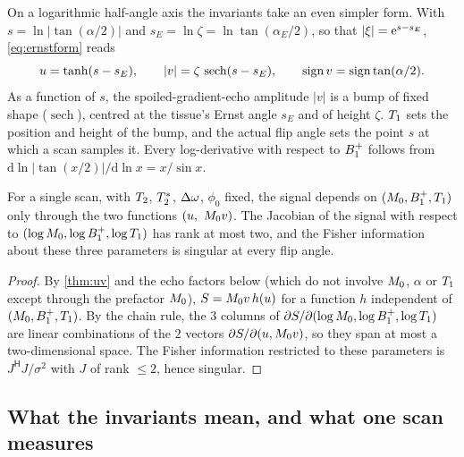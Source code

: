 On a logarithmic half-angle axis the invariants take an even simpler form. With
$s=\ln|\tan(\alpha/2)|$ and $s_E=\ln\zeta=\ln\tan(\alpha_E/2)$, so that $|\xi|=\mathrm{e}^{s-s_E}$, \eqref{eq:ernstform} reads
\begin{equation}
  u=\tanh(s-s_E),\qquad |v|=\zeta\,\operatorname{sech}(s-s_E),\qquad \operatorname{sign} v=\operatorname{sign}\tan(\alpha/2).
  \label{eq:logtan}
\end{equation}
As a function of $s$, the spoiled-gradient-echo amplitude $|v|$ is a bump of fixed shape
($\operatorname{sech}$), centred at the tissue's Ernst angle $s_E$ and of height $\zeta$. $T_1$ sets the position and
height of the bump, and the actual flip angle sets the point $s$ at which a scan samples it.
Every log-derivative with respect to $B_1^{+}$ follows from
$\mathrm d\ln|\tan(x/2)|/\mathrm d\ln x=x/\sin x$.

\begin{corollary}\label{cor:onescan}
For a single scan, with $T_2$, $T_2^{*}$, $\Delta\omega$, $\phi_0$ fixed, the signal depends on
$(M_0,B_1^{+},T_1)$ only through the two functions $(u,\ M_0 v)$. The Jacobian of the
signal with respect to $(\log M_0,\log B_1^{+},\log T_1)$ has rank at most two, and the
Fisher information about these three parameters is singular at every flip angle.
\end{corollary}
\begin{proof}
By \cref{thm:uv} and the echo factors below (which do not involve $M_0$, $\alpha$ or $T_1$
except through the prefactor $M_0$), $S=M_0 v\,h(u)$ for a function $h$ independent of
$(M_0,B_1^{+},T_1)$. By the chain rule, the $3$ columns of $\partial S/\partial(\log M_0,
\log B_1^{+},\log T_1)$ are linear combinations of the $2$ vectors $\partial S/\partial(u,M_0 v)$,
so they span at most a two-dimensional space. The Fisher information restricted to these
parameters is $J^{\mathsf H}J/\sigma^2$ with $J$ of rank $\le2$, hence singular.
\end{proof}

\subsection{What the invariants mean, and what one scan measures}\label{sec:invariants}

